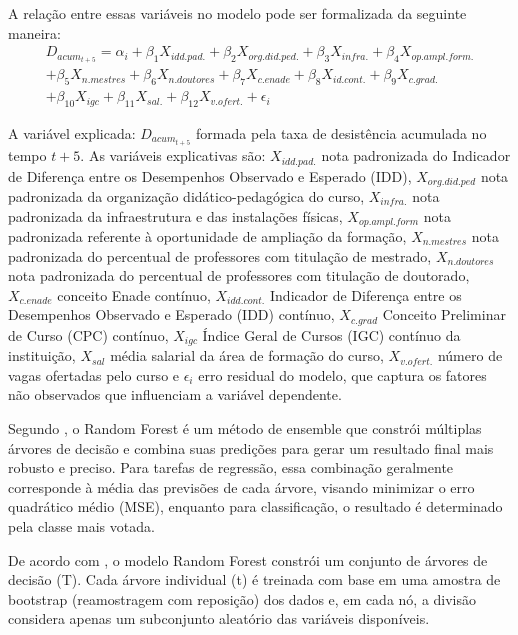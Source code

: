 A relação entre essas variáveis no modelo pode ser formalizada da seguinte maneira:
\begin{multline}
    D_{acum_{t+5}} = \alpha_{i} + \beta_{1}X_{idd.pad.} + \beta_{2}X_{org.did.ped.} + \beta_{3}X_{infra.} + \beta_{4}X_{op.ampl.form.} \\
    + \beta_{5}X_{n.mestres} + \beta_{6}X_{n.doutores} + \beta_{7}X_{c.enade} + \beta_{8}X_{id.cont.} + \beta_{9}X_{c.grad.} \\
    + \beta_{10}X_{igc} + \beta_{11}X_{sal.} + \beta_{12}X_{v.ofert.} + \epsilon_{i}
\end{multline}

A variável explicada: $D_{acum_{t+5}}$ formada pela taxa de desistência acumulada no tempo $t+5$. As variáveis explicativas são: $X_{idd.pad.}$ nota padronizada do Indicador de Diferença entre os Desempenhos Observado e Esperado (IDD), $X_{org.did.ped}$ nota padronizada da organização didático-pedagógica do curso, $X_{infra.}$ nota padronizada da infraestrutura e das instalações físicas, $X_{op.ampl.form}$ nota padronizada referente à oportunidade de ampliação da formação, $X_{n.mestres}$ nota padronizada do percentual de professores com titulação de mestrado, $X_{n.doutores}$ nota padronizada do percentual de professores com titulação de doutorado, $X_{c.enade}$ conceito Enade contínuo, $X_{idd.cont.}$ Indicador de Diferença entre os Desempenhos Observado e Esperado (IDD) contínuo, $X_{c.grad}$ Conceito Preliminar de Curso (CPC) contínuo, $X_{igc}$ Índice Geral de Cursos (IGC) contínuo da instituição, $X_{sal}$ média salarial da área de formação do curso, $X_{v.ofert.}$ número de vagas ofertadas pelo curso e $\epsilon_{i}$ erro residual do modelo, que captura os fatores não observados que influenciam a variável dependente.

Segundo , o Random Forest é um método de ensemble que constrói múltiplas árvores de decisão e combina suas predições para gerar um resultado final mais robusto e preciso. Para tarefas de regressão, essa combinação geralmente corresponde à média das previsões de cada árvore, visando minimizar o erro quadrático médio (MSE), enquanto para classificação, o resultado é determinado pela classe mais votada.

\newpage

De acordo com , o modelo Random Forest constrói um conjunto de árvores de decisão (T). Cada árvore individual (t) é treinada com base em uma amostra de bootstrap (reamostragem com reposição) dos dados e, em cada nó, a divisão considera apenas um subconjunto aleatório das variáveis disponíveis.

